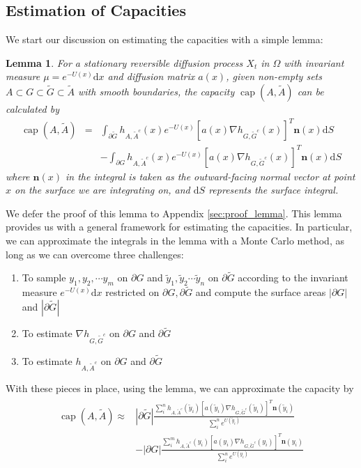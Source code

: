 \documentclass[english, aip, jcp, priprint, graphicx,floatfix]{revtex4-1}
\newcommand{\mathd}{\mathrm{d}}
\newtheorem{lemma}{Lemma}
\theoremstyle{plain}
\theoremstyle{definition}
\theoremstyle{plain}
\begin{document}
\subsection{Estimation of Capacities}

We start our discussion on estimating the capacities with a simple lemma:
\begin{lemma}\label{thm:capacity_lemma}
For a stationary reversible  diffusion process $X_t$ in $\Omega$ with
invariant measure ${\mu}= e^{- U (x)} \mathrm{d} x$ and diffusion matrix
$a (x)$, given non-empty sets $A \subset G \subset \tilde{G} \subset
\tilde{A}$ with smooth boundaries, the capacity
$\ensuremath{\operatorname{cap}} (A, \tilde{A})$ can be calculated by
\begin{eqnarray*}
\ensuremath{\operatorname{cap}} (A, \tilde{A}) & = & \int_{\partial
\tilde{G}}  h_{A,
\tilde{A}^c} (x) e^{- U (x)} [a (x) \nabla h_{G, \tilde{G}^c} (x)]^T \textbf{n} (x)\mathd S\\
&   & - \int_{\partial G}  h_{A, \tilde{A}^c} (x) e^{- U (x)} [a (x) \nabla h_{G, \tilde{G}^c} (x)]^T \textbf{n} (x)\mathd S
\end{eqnarray*}
where ${\textbf{n}} (x)$ in the integral is taken as the outward-facing normal vector at point $x$ on the surface we are integrating on, and $\mathd S$ represents the surface integral.
\end{lemma}

We defer the proof of this lemma to Appendix \ref{sec:proof_lemma}. This lemma provides us with a general framework for estimating the capacities.   In particular, we can approximate the integrals in the lemma with a Monte Carlo method, as long as we can overcome three challenges:
\begin{enumerate}
    \item To sample $y_1,y_2,\cdots y_m$ on $\partial G$ and $\tilde y_1,\tilde y_2 \cdots \tilde y_n$ on $\partial \tilde{G}$ according to the invariant measure $e^{- U(x)}\mathrm{d}x$ restricted on $\partial G, \partial \tilde{G}$ and compute the surface areas $|\partial G|$ and $|\partial \tilde G|$

\item To estimate $\nabla h_{G, \tilde{G}^c}$ on $\partial G$ and
$\partial \tilde{G}$

\item To estimate $h_{A, \tilde{A}^c}$ on $\partial G$ and $\partial
\tilde{G}$
\end{enumerate}
With these pieces in place, using the lemma, we can approximate the capacity by
\begin{gather}\label{eq:capesteq}
\begin{array}{cc}
\ensuremath{\operatorname{cap}} (A, \tilde{A}) \approx & 
|\partial \tilde G|\frac{\sum_i^n h_{A,\tilde A^c}(\tilde y_i)[a(\tilde y_i)\nabla h_{G,\tilde G^c}(\tilde y_i)]^T \textbf{n}(\tilde y_i)}{\sum_i^n e^{U(\tilde y_i)}} \\
& - |\partial G|\frac{\sum_i^m h_{A,\tilde A^c}(y_i)[a(y_i)\nabla h_{G,\tilde G^c}(y_i)]^T \textbf{n}(y_i)}{\sum_i^n e^{U(y_i)}} 
\end{array}
\end{gather}
\end{document}

